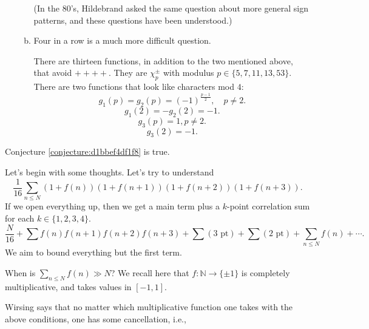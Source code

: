 \documentclass[reqno]{amsart} 
\begin{document}
\begin{enumerate}
\begin{enumerate}[(a)]
\begin{equation*}
    \end{equation*}
    (In the 80's, Hildebrand asked the same question about more general sign patterns, and these questions have been understood.)
  \item Four in a row is a much more difficult question.
    \begin{conjecture}\label{conjecture:d1bbef4df1f8}
      There are thirteen functions, in addition to the two mentioned above, that avoid $++++$.  They are $\chi_p^{\pm}$ with modulus $p \in \{5, 7, 11, 13, 53\}$.  There are two functions that look like characters mod $4$:
      \begin{equation*}
        g_1 (p) = g_2 (p) = (-1)^{\frac{p-1}{2}}, \quad p \neq 2.
      \end{equation*}
      \begin{equation*}
        g_1 (2) = - g_2 (2) = - 1.
      \end{equation*}
      \begin{equation*}
        g_3 (p) = 1, p \neq 2.
      \end{equation*}
      \begin{equation*}
        g_3 (2) = - 1.
      \end{equation*}
    \end{conjecture}
  \end{enumerate}
\end{enumerate}
\begin{theorem}[KMV, 2023]
  Conjecture \ref{conjecture:d1bbef4df1f8} is true.
\end{theorem}
Let's begin with some thoughts.  Let's try to understand
\begin{equation*}
  \frac{1}{16}
  \sum_{n \leq N} (1 + f (n )) (1 + f (n + 1)) (1 + f (n + 2 )) (1 + f (n + 3)).
\end{equation*}
If we open everything up, then we get a main term plus a $k$-point correlation sum for each $k \in \{1,2,3,4\}$.
\begin{equation*}
  \frac{N}{16}
  + \sum f (n) f (n + 1) f (n + 2) f (n + 3)
  + \sum (\text{3 pt})
  + \sum (\text{2 pt})
  + \sum_{n \leq N} f (n) + \dotsb.  
\end{equation*}
We aim to bound everything but the first term.
\begin{question}
  When is $\sum_{n \leq N} f (n) \gg N$?  We recall here that $f : \mathbb{N} \rightarrow \{\pm 1\}$ is completely multiplicative, and takes values in $[-1, 1]$.
\end{question}
Wirsing says that no matter which multiplicative function one takes with the above conditions, one has some cancellation, i.e.,
\end{document}

